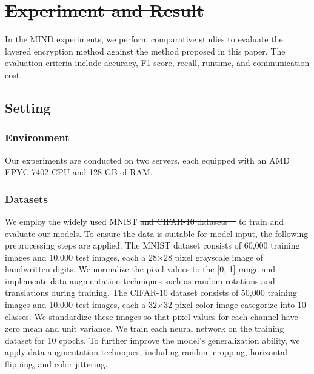 ﻿\documentclass[conference]{IEEEtran}
\providecommand{\DIFaddtex}[1]{{\protect\color{blue}\uwave{#1}}} %
\providecommand{\DIFdeltex}[1]{{\protect\color{red}\sout{#1}}}                      %
\providecommand{\DIFaddbegin}{} %
\providecommand{\DIFaddend}{} %
\providecommand{\DIFdelbegin}{} %
\providecommand{\DIFdelend}{} %
\providecommand{\DIFadd}[1]{\texorpdfstring{\DIFaddtex{#1}}{#1}} %
\providecommand{\DIFdel}[1]{\texorpdfstring{\DIFdeltex{#1}}{}} %
\newcommand{\DIFscaledelfig}{0.5}
\newlength{\DIFdelgraphicswidth} %
\newlength{\DIFdelgraphicsheight} %
\newcommand{\DIFaddincludegraphics}[2][]{{\color{blue}\fbox{\DIFOincludegraphics[#1]{#2}}}} %
\newcommand{\DIFdelincludegraphics}[2][]{%
\sbox{\DIFdelgraphicsbox}{\DIFOincludegraphics[#1]{#2}}%
\settoboxwidth{\DIFdelgraphicswidth}{\DIFdelgraphicsbox} %
\settoboxtotalheight{\DIFdelgraphicsheight}{\DIFdelgraphicsbox} %
\scalebox{\DIFscaledelfig}{%
\parbox[b]{\DIFdelgraphicswidth}{\usebox{\DIFdelgraphicsbox}\\[-\baselineskip] \rule{\DIFdelgraphicswidth}{0em}}\llap{\resizebox{\DIFdelgraphicswidth}{\DIFdelgraphicsheight}{%
\setlength{\unitlength}{\DIFdelgraphicswidth}%
\begin{picture}(1,1)%
\thicklines\linethickness{2pt} %
{\color[rgb]{1,0,0}\put(0,0){\framebox(1,1){}}}%
{\color[rgb]{1,0,0}\put(0,0){\line( 1,1){1}}}%
{\color[rgb]{1,0,0}\put(0,1){\line(1,-1){1}}}%
\end{picture}%
}\hspace*{3pt}}} %
} %
\DeclareRobustCommand{\DIFaddbegin}{\DIFOaddbegin \let\includegraphics\DIFaddincludegraphics} %
\DeclareRobustCommand{\DIFaddend}{\DIFOaddend \let\includegraphics\DIFOincludegraphics} %
\DeclareRobustCommand{\DIFdelbegin}{\DIFOdelbegin \let\includegraphics\DIFdelincludegraphics} %
\DeclareRobustCommand{\DIFdelend}{\DIFOaddend \let\includegraphics\DIFOincludegraphics} %
\begin{document}

\section{\DIFdelbegin \DIFdel{Experiment and Result}\DIFdelend \DIFaddbegin \DIFadd{Experimental Evaluations}\DIFaddend }
In the MIND experiments, we perform comparative studies to evaluate the layered encryption method against the method proposed in this paper. The evaluation criteria include accuracy, F1 score, recall, runtime, and communication cost.

\subsection{Setting}
\subsubsection{Environment} Our experiments are conducted on two servers, each equipped with an AMD EPYC 7402 CPU and 128 GB of RAM.
\subsubsection{Datasets} 
We employ the widely used MNIST\cite{xiao2017fashion} \DIFdelbegin \DIFdel{and CIFAR-10 datasets\mbox{%
\cite{krizhevsky2009learning} }\hskip0pt%
}\DIFdelend to train and evaluate our models. To ensure the data is suitable for model input, the following preprocessing steps are applied. The MNIST dataset consists of 60,000 training images and 10,000 test images, each a 28$\times$28 pixel grayscale image of handwritten digits. We normalize the pixel values to the [0, 1] range and implemente data augmentation techniques such as random rotations and translations during training. The CIFAR-10 dataset consists of 50,000 training images and 10,000 test images, each a 32$\times$32 pixel color image categorize into 10 classes. We standardize these images so that pixel values for each channel have zero mean and unit variance. We train each neural network on the training dataset for 10 epochs. To further improve the model's generalization ability, we apply data augmentation techniques, including random cropping, horizontal flipping, and color jittering.
\end{document}
